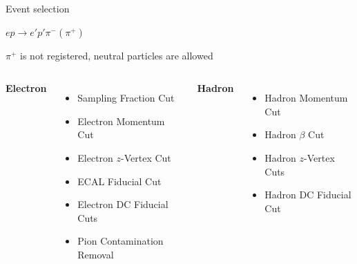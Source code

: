 \begin{frame}{Event selection}
    
    \textcolor{myblue}{\textbf{$ep \rightarrow e'p'\pi^-(\pi^+)$}}
    
    \vspace{0.1cm}
    
    $\pi^+$ is not registered, neutral particles are allowed
    
    \vspace{0.4cm}
    
    \begin{columns}[t]
    
    
        \textcolor{myblue}{\large\textbf{Electron}}
    
        \begin{itemize}
            \item Sampling Fraction Cut
            \item Electron Momentum Cut
            \item Electron $z$-Vertex Cut
            \item ECAL Fiducial Cut
            \item Electron DC Fiducial Cuts
            \item Pion Contamination Removal
        \end{itemize}
    
    
        \textcolor{myblue}{\large\textbf{Hadron}}
    
        \begin{itemize}
            \item Hadron Momentum Cut
            \item Hadron $\beta$ Cut
            \item Hadron $z$-Vertex Cuts
            \item Hadron DC Fiducial Cut
        \end{itemize}
    
    \end{columns}
    
\end{frame}
